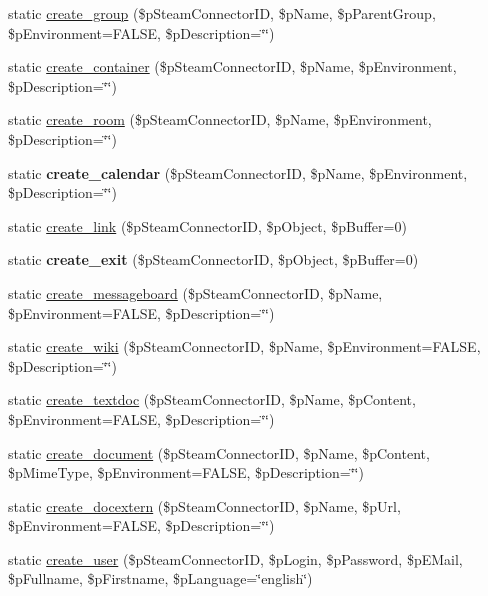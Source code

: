 \begin{DoxyCompactItemize}
\item 
static \hyperlink{classsteam__factory_adbd474b46b18be4731e7405e7d81d24a}{create\_\-group} (\$pSteamConnectorID, \$pName, \$pParentGroup, \$pEnvironment=FALSE, \$pDescription=\char`\"{}\char`\"{})
\item 
static \hyperlink{classsteam__factory_abd70ccffefc4ec52d515d8ba524e6e91}{create\_\-container} (\$pSteamConnectorID, \$pName, \$pEnvironment, \$pDescription=\char`\"{}\char`\"{})
\item 
static \hyperlink{classsteam__factory_a2fa6770fc4939bcd233683a9bf78d9eb}{create\_\-room} (\$pSteamConnectorID, \$pName, \$pEnvironment, \$pDescription=\char`\"{}\char`\"{})
\item 
\hypertarget{classsteam__factory_a77e965893f17abcd7010627af0712a62}{
static {\bfseries create\_\-calendar} (\$pSteamConnectorID, \$pName, \$pEnvironment, \$pDescription=\char`\"{}\char`\"{})}
\label{classsteam__factory_a77e965893f17abcd7010627af0712a62}

\item 
static \hyperlink{classsteam__factory_a13df1fdd71cccb64a75126938bad3ace}{create\_\-link} (\$pSteamConnectorID, \$pObject, \$pBuffer=0)
\item 
\hypertarget{classsteam__factory_a145b70348b84dc6c142414fd80d18d0e}{
static {\bfseries create\_\-exit} (\$pSteamConnectorID, \$pObject, \$pBuffer=0)}
\label{classsteam__factory_a145b70348b84dc6c142414fd80d18d0e}

\item 
static \hyperlink{classsteam__factory_a37d10f1031054174d95602f6111d5c19}{create\_\-messageboard} (\$pSteamConnectorID, \$pName, \$pEnvironment=FALSE, \$pDescription=\char`\"{}\char`\"{})
\item 
static \hyperlink{classsteam__factory_a16dcdc148ba4d27a6f01dde7b12b1455}{create\_\-wiki} (\$pSteamConnectorID, \$pName, \$pEnvironment=FALSE, \$pDescription=\char`\"{}\char`\"{})
\item 
static \hyperlink{classsteam__factory_ad63ab86e715dd220b1562045e1462b31}{create\_\-textdoc} (\$pSteamConnectorID, \$pName, \$pContent, \$pEnvironment=FALSE, \$pDescription=\char`\"{}\char`\"{})
\item 
static \hyperlink{classsteam__factory_a2e085593e91a7d99900d9daba578c800}{create\_\-document} (\$pSteamConnectorID, \$pName, \$pContent, \$pMimeType, \$pEnvironment=FALSE, \$pDescription=\char`\"{}\char`\"{})
\item 
static \hyperlink{classsteam__factory_a8516b25fd11d9dae771548087e269f51}{create\_\-docextern} (\$pSteamConnectorID, \$pName, \$pUrl, \$pEnvironment=FALSE, \$pDescription=\char`\"{}\char`\"{})
\item 
static \hyperlink{classsteam__factory_a0ae6cf7913353af08386d25a9d063fa8}{create\_\-user} (\$pSteamConnectorID, \$pLogin, \$pPassword, \$pEMail, \$pFullname, \$pFirstname, \$pLanguage=\char`\"{}english\char`\"{})
\end{DoxyCompactItemize}


